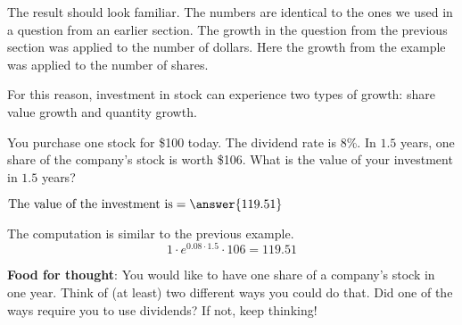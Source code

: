 \documentclass{ximera}
\begin{document}
The result should look familiar. The numbers are identical to the ones we used in a question from an earlier section. The growth in the question from the previous section was applied to the number of dollars. Here the growth from the example was applied to the number of shares. 

For this reason, investment in stock can experience two types of growth: share value growth and quantity growth. 

\begin{question}
You purchase one stock for \$100 today. The dividend rate is 8\%. In $1.5$ years, one share of the company's stock is worth \$106. What is the value of your investment in $1.5$ years?
	\begin{prompt}
		$\text{The value of the investment is}=\answer{119.51}$
	\end{prompt}
\end{question}

\begin{solution}
The computation is similar to the previous example.
	\begin{equation*}
		1\cdot e^{0.08\cdot 1.5}\cdot 106=119.51
	\end{equation*}
\end{solution}

{\bf Food for thought}: You would like to have one share of a company's stock in one year. Think of (at least) two different ways you could do that. Did one of the ways require you to use dividends? If not, keep thinking!
\end{document}
